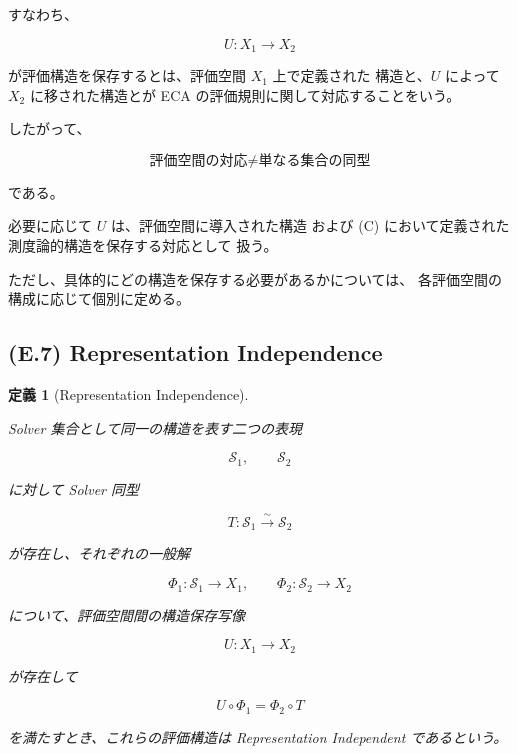 \documentclass[a4paper,11pt]{article}
\newtheorem{definition}{定義}[section]
\newcommand{\Solver}{\mathcal{S}}
\begin{document}
すなわち、

\begin{equation}
    U:
    X_1
    \longrightarrow
    X_2
\end{equation}

が評価構造を保存するとは、評価空間 $X_1$ 上で定義された
構造と、$U$ によって $X_2$ に移された構造とが
ECA の評価規則に関して対応することをいう。

したがって、

\begin{equation}
    \boxed{
        \text{評価空間の対応}
        \neq
        \text{単なる集合の同型}
    }
\end{equation}

である。

必要に応じて $U$ は、評価空間に導入された構造
および (C) において定義された測度論的構造を保存する対応として
扱う。

ただし、具体的にどの構造を保存する必要があるかについては、
各評価空間の構成に応じて個別に定める。


\subsection{(E.7) Representation Independence}
\label{subsec:E7}

\begin{definition}[Representation Independence]
\label{def:E-representation-independence}

Solver 集合として同一の構造を表す二つの表現

\begin{equation}
    \Solver_1,
    \qquad
    \Solver_2
\end{equation}

に対して Solver 同型

\begin{equation}
    T:
    \Solver_1
    \overset{\sim}{\longrightarrow}
    \Solver_2
\end{equation}

が存在し、それぞれの一般解

\begin{equation}
    \Phi_1:\Solver_1\to X_1,
    \qquad
    \Phi_2:\Solver_2\to X_2
\end{equation}

について、評価空間間の構造保存写像

\begin{equation}
    U:X_1\to X_2
\end{equation}

が存在して

\begin{equation}
    U\circ\Phi_1
    =
    \Phi_2\circ T
\end{equation}

を満たすとき、これらの評価構造は
\emph{Representation Independent} であるという。
\end{definition}
\end{document}

